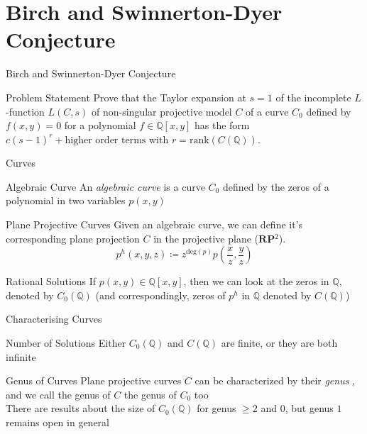 \documentclass[handout]{beamer}
\newcommand{\Rational}{\mathbb{Q}}
\newcommand{\RP}{\mathbf{RP}}
\begin{document}
  \section{Birch and Swinnerton-Dyer Conjecture}
  \begin{frame}{Birch and Swinnerton-Dyer Conjecture}
      \begin{block}{Problem Statement}
          Prove that the Taylor expansion at $s=1$ of the incomplete
          $L$-function $L(C, s)$ of non-singular projective model $C$ of a
          curve $C_0$ defined by $f(x, y) = 0$ for a polynomial
          $f \in \Rational [x, y]$ has the form
          $c(s-1)^r + \text{higher order terms}$ with
          $r = \mathrm{rank}(C(\Rational))$.
      \end{block}
  \end{frame}
  \begin{frame}{Curves}
      \pause
      \begin{block}{Algebraic Curve}
          An \textit{algebraic curve} is a curve $C_0$ defined by the zeros
          of a polynomial in two variables $p(x, y)$
      \end{block}
      \pause
      \begin{block}{Plane Projective Curves}
          Given an algebraic curve, we can define it's corresponding plane
          projection $C$ in the projective plane ($\RP{} ^2$).
          $$p^h(x, y, z) \coloneqq z^{\mathrm{deg}(p)}p(\frac{x}{z},
          \frac{y}{z})$$
      \end{block}
      \pause
      \begin{block}{Rational Solutions}
          If $p(x, y) \in \Rational\left[x, y\right]$, then we can look at the
          zeros in $\Rational$, denoted by $C_0(\Rational)$ (and
          correspondingly, zeros of $p^h$ in $\Rational$ denoted by
          $C(\Rational)$)
      \end{block}
  \end{frame}
  \begin{frame}{Characterising Curves}
      \pause
      \begin{block}{Number of Solutions}
          Either $C_0(\Rational)$ and $C(\Rational)$ are finite, or they are
          both infinite
      \end{block}
      \pause
      \begin{block}{Genus of Curves}
          Plane projective curves $C$ can be characterized by their
          \textit{genus} , and we call the genus of
          $C$ the genus of $C_0$ too \pause \\
          There are results about the size of $C_0(\Rational)$ for genus $\ge
          2$ and $0$, but genus $1$ remains open in general
      \end{block}
  \end{frame}
\end{document}
